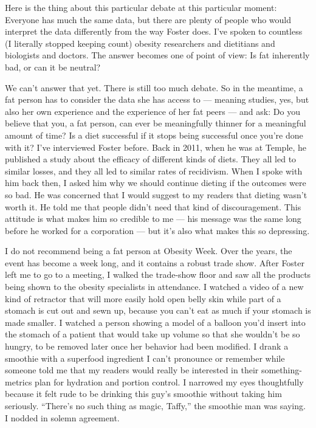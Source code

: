 Here is the thing about this particular debate at this particular
moment: Everyone has much the same data, but there are plenty of people
who would interpret the data differently from the way Foster does. I've
spoken to countless (I literally stopped keeping count) obesity
researchers and dietitians and biologists and doctors. The answer
becomes one of point of view: Is fat inherently bad, or can it be
neutral?

We can't answer that yet. There is still too much debate. So in the
meantime, a fat person has to consider the data she has access to ---
meaning studies, yes, but also her own experience and the experience of
her fat peers --- and ask: Do you believe that you, a fat person, can
ever be meaningfully thinner for a meaningful amount of time? Is a diet
successful if it stops being successful once you're done with it? I've
interviewed Foster before. Back in 2011, when he was at Temple, he
published a study about the efficacy of different kinds of diets. They
all led to similar losses, and they all led to similar rates of
recidivism. When I spoke with him back then, I asked him why we should
continue dieting if the outcomes were so bad. He was concerned that I
would suggest to my readers that dieting wasn't worth it. He told me
that people didn't need that kind of discouragement. This attitude is
what makes him so credible to me --- his message was the same long
before he worked for a corporation --- but it's also what makes this so
depressing.

I do not recommend being a fat person at Obesity Week. Over the years,
the event has become a week long, and it contains a robust trade show.
After Foster left me to go to a meeting, I walked the trade-show floor
and saw all the products being shown to the obesity specialists in
attendance. I watched a video of a new kind of retractor that will more
easily hold open belly skin while part of a stomach is cut out and sewn
up, because you can't eat as much if your stomach is made smaller. I
watched a person showing a model of a balloon you'd insert into the
stomach of a patient that would take up volume so that she wouldn't be
so hungry, to be removed later once her behavior had been modified. I
drank a smoothie with a superfood ingredient I can't pronounce or
remember while someone told me that my readers would really be
interested in their something-metrics plan for hydration and portion
control. I narrowed my eyes thoughtfully because it felt rude to be
drinking this guy's smoothie without taking him seriously. ``There's no
such thing as magic, Taffy,'' the smoothie man was saying. I nodded in
solemn agreement.

